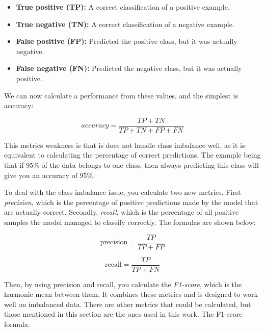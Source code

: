         \begin{itemize}
            \item \textbf{True positive (TP):} A correct classification of a positive example.
            \item \textbf{True negative (TN):} A correct classification of a negative example.
            \item \textbf{False positive (FP):} Predicted the positive class, but it was actually negative.
            \item \textbf{False negative (FN):} Predicted the negative class, but it was actually positive.
            \end{itemize}
        
        We can now calculate a performance from these values, and the simplest is accuracy\cite{powers2020evaluation_f1_recall_precision}:
        
        \begin{equation}
            accuracy = \dfrac{TP+TN}{TP+TN+FP+FN} 
        \end{equation}
        
        This metrics weakness is that is does not handle class imbalance well\cite{powers2020evaluation_f1_recall_precision}, as it is equivalent to calculating the percentage of correct predictions. The example being that if 95\% of the data belongs to one class, then always predicting this class will give you an accuracy of 95\%.
        
        To deal with the class imbalance issue, you calculate two new metrics\cite{powers2020evaluation_f1_recall_precision}. First \textit{precision}, which is the percentage of positive predictions made by the model that are actually correct. Secondly, \textit{recall}, which is the percentage of all positive samples the model managed to classify correctly. The formulas are shown below:
        
        \begin{equation}
            \textrm{precision} = \dfrac{TP}{TP+FP}
        \end{equation}
        
        \begin{equation}
            \textrm{recall} = \dfrac{TP}{TP+FN}
        \end{equation}
        
        Then, by using precision and recall, you calculate the \textit{F1-score}, which is the harmonic mean between them\cite{powers2020evaluation_f1_recall_precision}. It combines these metrics and is designed to work well on imbalanced data. There are other metrics that could be calculated, but those mentioned in this section are the ones used in this work. The F1-score formula:
        
